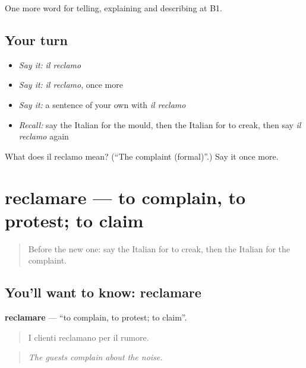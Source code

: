 \begin{grammarlens}[title={What you've built}]
One more word for telling, explaining and describing at B1.
\end{grammarlens}

\subsection*{Your turn}
\begin{itemize}
\raggedright
  \item \emph{Say it:} \emph{il reclamo}
  \item \emph{Say it:} \emph{il reclamo}, once more
  \item \emph{Say it:} a sentence of your own with \emph{il reclamo}
  \item \emph{Recall:} say the Italian for the mould, then the Italian for to creak, then say \emph{il reclamo} again
\end{itemize}

\begin{tcolorbox}[breakable,colback=teal!4,colframe=teal!35!black,title={Before you move on}]
What does il reclamo mean? (\textquotedblleft{}The complaint (formal)\textquotedblright{}.) Say it once more.
\end{tcolorbox}
\section[reclamare]{reclamare — to complain, to protest; to claim}

\label{lesson:IT-C438-reclamare}



\begin{quote}
Before the new one: say the Italian for to creak, then the Italian for the complaint.
\end{quote}

\subsection*{You'll want to know: reclamare}
\textbf{reclamare} — \textquotedblleft{}to complain, to protest; to claim\textquotedblright{}.

\begin{quote}
I clienti reclamano per il rumore.
\end{quote}

\begin{quote}
\emph{The guests complain about the noise.}
\end{quote}

